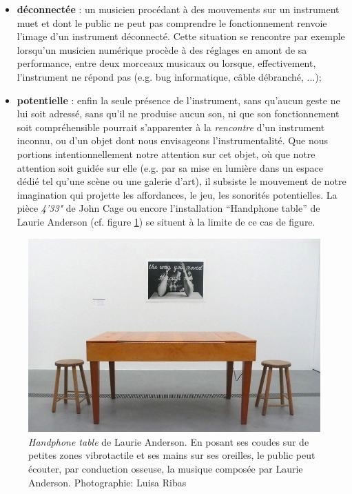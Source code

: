 \begin{itemize}[noitemsep]
	\item \textbf{déconnectée} : un musicien procédant à des mouvements sur un instrument muet et dont le public ne peut pas comprendre le fonctionnement renvoie l'image d'un instrument déconnecté. Cette situation se rencontre par exemple lorsqu'un musicien numérique procède à des réglages en amont de sa performance, entre deux morceaux musicaux ou lorsque, effectivement, l'instrument ne répond pas (e.g. bug informatique, câble débranché, ...);
	\item \textbf{potentielle} : enfin la seule présence de l'instrument, sans qu'aucun geste ne lui soit adressé, sans qu'il ne produise aucun son, ni que son fonctionnement soit compréhensible pourrait s'apparenter à la \textit{rencontre} d'un instrument inconnu, ou d'un objet dont nous envisageons l'instrumentalité. Que nous portions intentionnellement notre attention sur cet objet, où que notre attention soit guidée sur elle (e.g. par sa mise en lumière dans un espace dédié tel qu'une scène ou une galerie d'art), il subsiste le mouvement de notre imagination qui projette les affordances, le jeu, les sonorités potentielles. La pièce \textit{4'33"} de John Cage ou encore l'installation ``Handphone table'' de Laurie Anderson (cf. figure \ref{fig:gesture:HandphoneTable}) se situent à la limite de ce cas de figure.
\end{itemize}
\begin{figure}[!htbp]
	\captionsetup{format=plain}%
	\includegraphics[width=\linewidth]{gfx/03_gesture/LaurieAnderson-HandphoneTable-PhotoLuisaRibas.jpg}
	\caption[\textit{Handphone table} de Laurie Anderson]{\textit{Handphone table} de Laurie Anderson. En posant ses coudes sur de petites zones vibrotactile et ses mains sur ses oreilles, le public peut écouter, par conduction osseuse, la musique composée par Laurie Anderson. Photographie: Luisa Ribas}
	\label{fig:gesture:HandphoneTable}
\end{figure}
